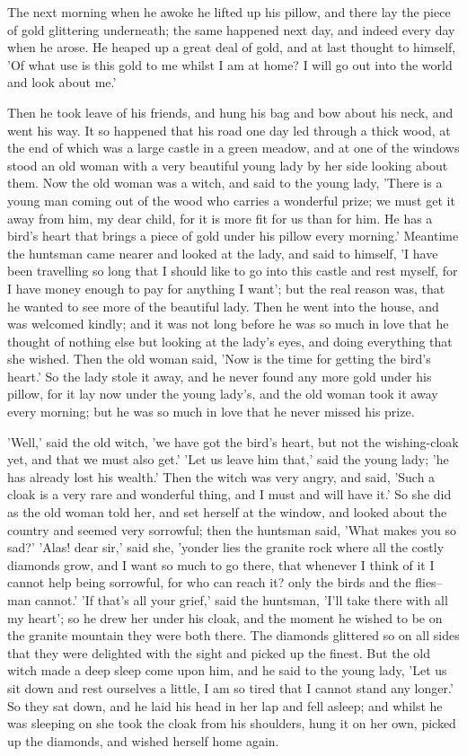 \documentclass[12pt]{book}
\begin{document}
The next morning when he awoke he lifted up his pillow, and there lay
the piece of gold glittering underneath; the same happened next day,
and indeed every day when he arose. He heaped up a great deal of gold,
and at last thought to himself, 'Of what use is this gold to me whilst
I am at home? I will go out into the world and look about me.'

Then he took leave of his friends, and hung his bag and bow about his
neck, and went his way. It so happened that his road one day led
through a thick wood, at the end of which was a large castle in a
green meadow, and at one of the windows stood an old woman with a very
beautiful young lady by her side looking about them. Now the old woman
was a witch, and said to the young lady, 'There is a young man coming
out of the wood who carries a wonderful prize; we must get it away
from him, my dear child, for it is more fit for us than for him. He
has a bird's heart that brings a piece of gold under his pillow every
morning.' Meantime the huntsman came nearer and looked at the lady,
and said to himself, 'I have been travelling so long that I should
like to go into this castle and rest myself, for I have money enough
to pay for anything I want'; but the real reason was, that he wanted
to see more of the beautiful lady. Then he went into the house, and
was welcomed kindly; and it was not long before he was so much in love
that he thought of nothing else but looking at the lady's eyes, and
doing everything that she wished. Then the old woman said, 'Now is the
time for getting the bird's heart.' So the lady stole it away, and he
never found any more gold under his pillow, for it lay now under the
young lady's, and the old woman took it away every morning; but he was
so much in love that he never missed his prize.

'Well,' said the old witch, 'we have got the bird's heart, but not the
wishing-cloak yet, and that we must also get.' 'Let us leave him
that,' said the young lady; 'he has already lost his wealth.' Then the
witch was very angry, and said, 'Such a cloak is a very rare and
wonderful thing, and I must and will have it.' So she did as the old
woman told her, and set herself at the window, and looked about the
country and seemed very sorrowful; then the huntsman said, 'What makes
you so sad?' 'Alas! dear sir,' said she, 'yonder lies the granite rock
where all the costly diamonds grow, and I want so much to go there,
that whenever I think of it I cannot help being sorrowful, for who can
reach it? only the birds and the flies--man cannot.' 'If that's all
your grief,' said the huntsman, 'I'll take there with all my heart';
so he drew her under his cloak, and the moment he wished to be on the
granite mountain they were both there. The diamonds glittered so on
all sides that they were delighted with the sight and picked up the
finest. But the old witch made a deep sleep come upon him, and he said
to the young lady, 'Let us sit down and rest ourselves a little, I am
so tired that I cannot stand any longer.' So they sat down, and he
laid his head in her lap and fell asleep; and whilst he was sleeping
on she took the cloak from his shoulders, hung it on her own, picked
up the diamonds, and wished herself home again.
\end{document}
